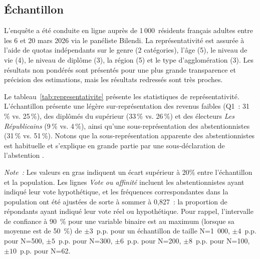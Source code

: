 \documentclass[12pt,french]{article}
\begin{document}

\subsection{Échantillon}

L'enquête a été conduite en ligne auprès de 1\,000~résidents français adultes entre les 6 et 20 mars 2026 via le panéliste Bilendi. 
La représentativité est assurée à l'aide de quotas indépendants sur le genre (2 catégories), l'âge (5), le niveau de vie (4), le niveau de diplôme (3), la région (5) et le type d'agglomération (3). 
Les résultats non pondérés sont présentés pour une plus grande transparence et précision des estimations, mais les résultats redressés sont très proches.

Le tableau~\ref{tab:representativite} présente les statistiques de représentativité. L'échantillon présente une légère sur-représentation des revenus faibles (Q1~: 31\,\% vs. 25\,\%), des diplômés du supérieur (33\,\% vs. 26\,\%) et des électeurs \textit{Les Républicains} (9\,\% vs. 4\,\%), ainsi qu'une sous-représentation des abstentionnistes (31\,\% vs. 51\,\%). Notons que la sous-représentation apparente des abstentionnistes est habituelle et s'explique en grande partie par une sous-déclaration de l'abstention \citep{sciarini_turnout_2016}. 

\begin{table}[htbp]
  \centering
  \caption{Représentativité de l'échantillon.}
  \label{tab:representativite}
  
  \par\smallskip
  {\footnotesize \textit{Note~:} Les valeurs en gras indiquent un écart supérieur à 20\% entre l'échantillon et la population. Les lignes \textit{Vote ou affinité} incluent les abstentionnistes ayant indiqué leur vote hypothétique, et les fréquences correspondantes dans la population ont été ajustées de sorte à sommer à 0,827~: la proportion de répondants ayant indiqué leur vote réel ou hypothétique. %
  Pour rappel, l'intervalle de confiance à 90~\% pour une variable binaire est au maximum (lorsque sa moyenne est de 50~\%) de $\pm3$~p.p. pour un échantillon de taille N=1~000, $\pm4$~p.p. pour N=500, $\pm5$~p.p. pour N=300, $\pm6$~p.p. pour N=200, $\pm8$~p.p. pour N=100, $\pm10$~p.p. pour N=62.
  }
\end{table}
\end{document}
